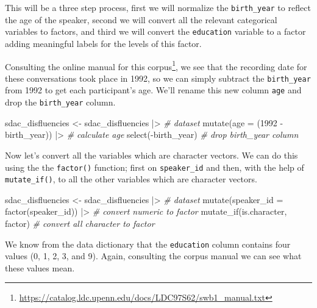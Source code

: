 \documentclass[
  letterpaper,
]{latex/krantz}
\newenvironment{Shaded}{\begin{snugshade}}{\end{snugshade}}
\newcommand{\AttributeTok}[1]{\textcolor[rgb]{0.00,0.00,0.00}{#1}}
\newcommand{\CommentTok}[1]{\textcolor[rgb]{0.00,0.00,0.00}{\textit{#1}}}
\newcommand{\DecValTok}[1]{\textcolor[rgb]{0.00,0.00,0.00}{#1}}
\newcommand{\FunctionTok}[1]{\textcolor[rgb]{0.00,0.00,0.00}{#1}}
\newcommand{\NormalTok}[1]{\textcolor[rgb]{0.00,0.00,0.00}{#1}}
\newcommand{\OtherTok}[1]{\textcolor[rgb]{0.00,0.00,0.00}{#1}}
\newcommand{\SpecialCharTok}[1]{\textcolor[rgb]{0.00,0.00,0.00}{#1}}
\DeclareRobustCommand{\href}[2]{#2\footnote{\url{#1}}}
\begin{document}
This will be a three step process, first we will normalize the
\texttt{birth\_year} to reflect the age of the speaker, second we will
convert all the relevant categorical variables to factors, and third we
will convert the \texttt{education} variable to a factor adding
meaningful labels for the levels of this factor.

Consulting the
\href{https://catalog.ldc.upenn.edu/docs/LDC97S62/swb1_manual.txt}{online
manual for this corpus}, we see that the recording date for these
conversations took place in 1992, so we can simply subtract the
\texttt{birth\_year} from 1992 to get each participant's age. We'll
rename this new column \texttt{age} and drop the \texttt{birth\_year}
column.

\begin{Shaded}
\begin{Highlighting}[]
\NormalTok{sdac\_disfluencies }\OtherTok{\textless{}{-}} 
\NormalTok{  sdac\_disfluencies }\SpecialCharTok{|\textgreater{}} \CommentTok{\# dataset}
  \FunctionTok{mutate}\NormalTok{(}\AttributeTok{age =}\NormalTok{ (}\DecValTok{1992} \SpecialCharTok{{-}}\NormalTok{ birth\_year)) }\SpecialCharTok{|\textgreater{}} \CommentTok{\# calculate age}
  \FunctionTok{select}\NormalTok{(}\SpecialCharTok{{-}}\NormalTok{birth\_year) }\CommentTok{\# drop \textasciigrave{}birth\_year\textasciigrave{} column}
\end{Highlighting}
\end{Shaded}

Now let's convert all the variables which are character vectors. We can
do this using the the \texttt{factor()} function; first on
\texttt{speaker\_id} and then, with the help of \texttt{mutate\_if()},
to all the other variables which are character vectors.

\begin{Shaded}
\begin{Highlighting}[]
\NormalTok{sdac\_disfluencies }\OtherTok{\textless{}{-}} 
\NormalTok{  sdac\_disfluencies }\SpecialCharTok{|\textgreater{}} \CommentTok{\# dataset}
  \FunctionTok{mutate}\NormalTok{(}\AttributeTok{speaker\_id =} \FunctionTok{factor}\NormalTok{(speaker\_id)) }\SpecialCharTok{|\textgreater{}} \CommentTok{\# convert numeric to factor}
  \FunctionTok{mutate\_if}\NormalTok{(is.character, factor) }\CommentTok{\# convert all character to factor}
\end{Highlighting}
\end{Shaded}

We know from the data dictionary that the \texttt{education} column
contains four values (0, 1, 2, 3, and 9). Again, consulting the corpus
manual we can see what these values mean.
\end{document}
